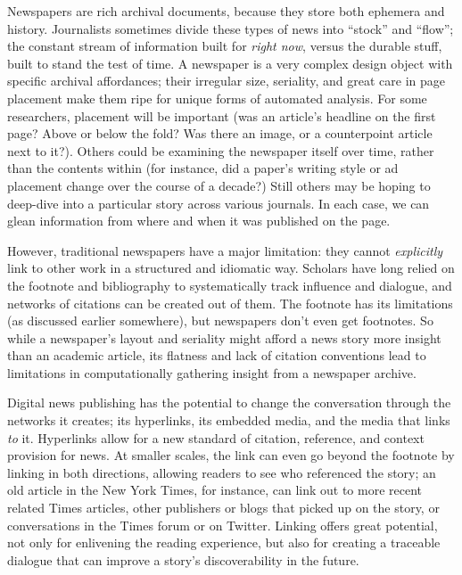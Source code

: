 Newspapers are rich archival documents, because they store both ephemera and history. Journalists sometimes divide these types of news into ``stock'' and ``flow''; the constant stream of information built for \emph{right now}, versus the durable stuff, built to stand the test of time. A newspaper is a very complex design object with specific archival affordances; their irregular size, seriality, and great care in page placement make them ripe for unique forms of automated analysis. For some researchers, placement will be important (was an article’s headline on the first page? Above or below the fold? Was there an image, or a counterpoint article next to it?). Others could be examining the newspaper itself over time, rather than the contents within (for instance, did a paper’s writing style or ad placement change over the course of a decade?) Still others may be hoping to deep-dive into a particular story across various journals. In each case, we can glean information from where and when it was published on the page.

However, traditional newspapers have a major limitation: they cannot \emph{explicitly} link to other work in a structured and idiomatic way. Scholars have long relied on the footnote and bibliography to systematically track influence and dialogue, and networks of citations can be created out of them. The footnote has its limitations (as discussed earlier somewhere), %
but newspapers don't even get footnotes. So while a newspaper's layout and seriality might afford a news story more insight than an academic article, its flatness and lack of citation conventions lead to limitations in computationally gathering insight from a newspaper archive.

Digital news publishing has the potential to change the conversation through the networks it creates; its hyperlinks, its embedded media, and the media that links \emph{to} it. Hyperlinks allow for a new standard of citation, reference, and context provision for news. At smaller scales, the link can even go beyond the footnote by linking in both directions, allowing readers to see who referenced the story; an old article in the New York Times, for instance, can link out to more recent related Times articles, other publishers or blogs that picked up on the story, or conversations in the Times forum or on Twitter. Linking offers great potential, not only for enlivening the reading experience, but also for creating a traceable dialogue that can improve a story's discoverability in the future.

